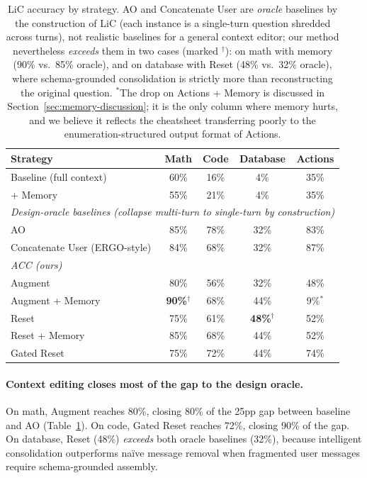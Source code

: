 \documentclass{article}
\begin{document}
\begin{table}[t]
\centering
\begin{tabular}{lcccc}
\toprule
\textbf{Strategy} & \textbf{Math} & \textbf{Code} & \textbf{Database} & \textbf{Actions} \\
\midrule
Baseline (full context) & 60\% & 16\% & 4\% & 35\% \\
\quad + Memory & 55\% & 21\% & 4\% & 35\% \\
\midrule
\multicolumn{5}{l}{\emph{Design-oracle baselines (collapse multi-turn to single-turn by construction)}} \\
\quad AO \citep{huang2026context} & 85\% & 78\% & 32\% & 83\% \\
\quad Concatenate User (ERGO-style) & 84\% & 68\% & 32\% & 87\% \\
\midrule
\multicolumn{5}{l}{\emph{ACC (ours)}} \\
\quad Augment & 80\% & 56\% & 32\% & 48\% \\
\quad Augment + Memory & \textbf{90\%}$^{\dagger}$ & 68\% & 44\% & 9\%$^{\ast}$ \\
\quad Reset & 75\% & 61\% & \textbf{48\%}$^{\dagger}$ & 52\% \\
\quad Reset + Memory & 85\% & 68\% & 44\% & 52\% \\
\quad Gated Reset & 75\% & 72\% & 44\% & 74\% \\
\bottomrule
\end{tabular}
\caption{LiC accuracy by strategy. AO and Concatenate User are \emph{oracle} baselines by the construction of LiC (each instance is a single-turn question shredded across turns), not realistic baselines for a general context editor; our method nevertheless \emph{exceeds} them in two cases (marked $^{\dagger}$): on math with memory (90\% vs.\ 85\% oracle), and on database with Reset (48\% vs.\ 32\% oracle), where schema-grounded consolidation is strictly more than reconstructing the original question. $^{\ast}$The drop on Actions + Memory is discussed in Section~\ref{sec:memory-discussion}; it is the only column where memory hurts, and we believe it reflects the cheatsheet transferring poorly to the enumeration-structured output format of Actions.}
\label{tab:lic-main}
\end{table}

\paragraph{Context editing closes most of the gap to the design oracle.}
On math, Augment reaches 80\%, closing 80\% of the 25pp gap between baseline and AO (Table~\ref{tab:lic-main}). On code, Gated Reset reaches 72\%, closing 90\% of the gap. On database, Reset (48\%) \emph{exceeds} both oracle baselines (32\%), because intelligent consolidation outperforms na\"ive message removal when fragmented user messages require schema-grounded assembly.
\end{document}
